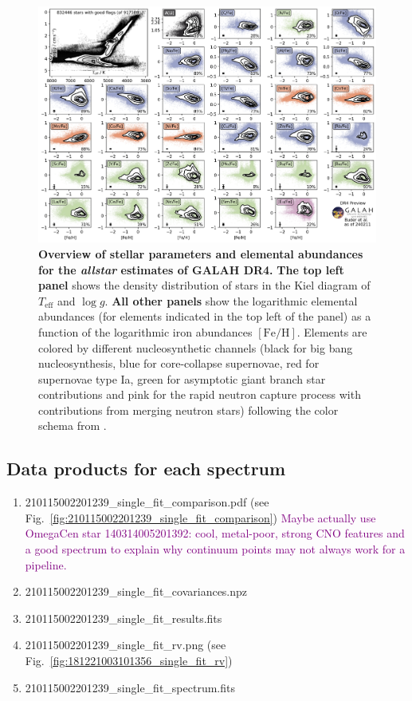 \documentclass[
  journal=pasa,
  manuscript=research-paper, %
  year=2024,
  volume=37
]{cup-journal}
\newcommand{\SB}[1]{{\textcolor{purple}{#1}}}
\newcommand{\Teff}{$T_\mathrm{eff}$\xspace}
\newcommand{\logg}{$\log g$\xspace}
\newcommand{\feh}{$\mathrm{[Fe/H]}$\xspace}
\begin{document}
\begin{landscape}
\begin{figure}
\includegraphics[width=0.975\columnwidth]{figures/galah_dr4_overview_allstar.png}
\caption{
\textbf{Overview of stellar parameters and elemental abundances for the \textit{allstar} estimates of GALAH DR4.}
\textbf{The top left panel} shows the density distribution of stars in the Kiel diagram of \Teff and \logg.
\textbf{All other panels} show the logarithmic elemental abundances (for elements indicated in the top left of the panel) as a function of the logarithmic iron abundances \feh. Elements are colored by different nucleosynthetic channels (black for big bang nucleosynthesis, blue for core-collapse supernovae, red for supernovae type Ia, green for asymptotic giant branch star contributions and pink for the rapid neutron capture process with contributions from merging neutron stars) following the color schema from \citet{Kobayashi2020}.
}
\label{fig:galah_dr4_overview_allstar}
\end{figure}
\end{landscape}

\subsection{Data products for each spectrum}
\label{sec:data_products_for_each_spectrum}

\begin{enumerate}
   \item 210115002201239\_single\_fit\_comparison.pdf (see Fig.~\ref{fig:210115002201239_single_fit_comparison}) \SB{Maybe actually use OmegaCen star 140314005201392: cool, metal-poor, strong CNO features and a good spectrum to explain why continuum points may not always work for a pipeline.}
   \item 210115002201239\_single\_fit\_covariances.npz
   \item 210115002201239\_single\_fit\_results.fits
   \item 210115002201239\_single\_fit\_rv.png (see Fig.~\ref{fig:181221003101356_single_fit_rv})
   \item 210115002201239\_single\_fit\_spectrum.fits
\end{enumerate}
\end{document}
